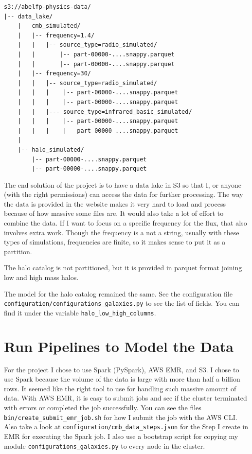 \documentclass[12pt,letterpaper]{article}
\begin{document}
\begin{verbatim}
s3://abelfp-physics-data/
|-- data_lake/
    |-- cmb_simulated/
    |   |-- frequency=1.4/
    |   |   |-- source_type=radio_simulated/
    |   |       |-- part-00000-....snappy.parquet
    |   |       |-- part-00000-....snappy.parquet
    |   |-- frequency=30/
    |   |   |-- source_type=radio_simulated/
    |   |   |    |-- part-00000-....snappy.parquet
    |   |   |    |-- part-00000-....snappy.parquet
    |   |   |--- source_type=infrared_basic_simulated/
    |   |   |    |-- part-00000-....snappy.parquet
    |   |   |    |-- part-00000-....snappy.parquet
    |
    |-- halo_simulated/
        |-- part-00000-....snappy.parquet
        |-- part-00000-....snappy.parquet
\end{verbatim}

The end solution of the project is to have a data lake in S3 so that I, or
anyone (with the right permissions) can access the data for further processing.
The way the data is provided in the website makes it very hard to load and
process because of how massive some files are. It would also take a lot of
effort to combine the data. If I want to focus on a specific frequency for the
flux, that also involves extra work. Though the frequency is a not a string,
usually with these types of simulations, frequencies are finite, so it makes
sense to put it as a partition.

The halo catalog is not partitioned, but it is provided in parquet format
joining low and high mass halos.

The model for the halo catalog remained the same. See the configuration file
\texttt{configuration/configurations\_galaxies.py} to see the list of fields.
You can find it under the variable \texttt{halo\_low\_high\_columns}.

\section*{Run Pipelines to Model the Data}
For the project I chose to use Spark (PySpark), AWS EMR, and S3. I chose to use
Spark because the volume of the data is large with more than half a billion
rows. It seemed like the right tool to use for handling such massive amount of
data. With AWS EMR, it is easy to submit jobs and see if the cluster terminated
with errors or completed the job successfully. You can see the files
\texttt{bin/create\_submit\_emr\_job.sh} for how I submit the job with the AWS
CLI. Also take a look at \texttt{configuration/cmb\_data\_steps.json} for the
Step I create in EMR for executing the Spark job. I also use a bootstrap script
for copying my module \texttt{configurations\_galaxies.py} to every node in the
cluster. 
\end{document}

